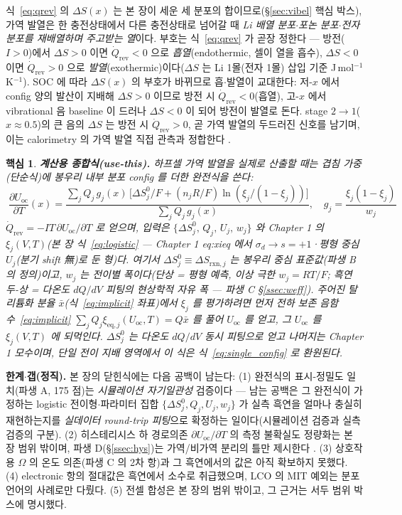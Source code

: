 \documentclass[11pt,a4paper]{article}
\newtheorem*{keybox}{핵심}
\newcommand{\rxn}{\mathrm{rxn}}
\newcommand{\eq}{\mathrm{eq}}
\newcommand{\rev}{\mathrm{rev}}
\newcommand{\oc}{\mathrm{oc}}
\begin{document}
식~\eqref{eq:qrev} 의 $\Delta S(x)$ 는 본 장이 세운 세 분포의 합이므로(\S\ref{sec:vibel} 핵심 박스), 가역
발열은 한 충전상태에서 다른 충전상태로 넘어갈 때 \emph{Li 배열 분포$\cdot$포논 분포$\cdot$전자 분포를 재배열하며
주고받는 열}이다. 부호는 식~\eqref{eq:qrev} 가 곧장 정한다 — 방전($I>0$)에서 $\Delta S>0$ 이면 $\dot Q_\rev<0$ 으로
\emph{흡열}(endothermic, 셀이 열을 흡수), $\Delta S<0$ 이면 $\dot Q_\rev>0$ 으로 \emph{발열}(exothermic)이다($\Delta S$
는 Li 1몰(전자 1몰) 삽입 기준 J\,mol$^{-1}$K$^{-1}$). SOC 에 따라 $\Delta S(x)$ 의 부호가 바뀌므로 흡$\cdot$발열이 교대한다: 저-$x$ 에서
config 양의 발산이 지배해 $\Delta S>0$ 이므로 방전 시 $\dot Q_\rev<0$(흡열), 고-$x$ 에서 vibrational 음
baseline 이 드러나 $\Delta S<0$ 이 되어 방전이 발열로 돈다. stage $2\to1$($x\approx0.5$)의 큰 음의 $\Delta S$
는 방전 시 $\dot Q_\rev>0$, 곧 가역 발열의 두드러진 신호를 남기며, 이는 calorimetry 의 가역 발열 직접 관측과
정합한다 \cite{standardised2024}.

\begin{keybox}
\textbf{계산용 종합식(use-this).} 하프셀 가역 발열을 실제로 산출할 때는 겹침 가중(단순식)에 봉우리 내부 분포
config 를 더한 \emph{완전식}을 쓴다:
\[
\boxed{\;\frac{\partial U_\oc}{\partial T}(x)
=\frac{\sum_j Q_j\,g_j(x)\,\bigl[\Delta S^0_j/F+(n_jR/F)\ln(\xi_j/(1-\xi_j))\bigr]}{\sum_j Q_j\,g_j(x)},\quad
g_j=\frac{\xi_j(1-\xi_j)}{w_j}\;}
\]
$\dot Q_\rev=-IT\,\partial U_\oc/\partial T$ 로 얻으며, \emph{입력}은 $\{\Delta S^0_j,\,Q_j,\,U_j,\,w_j\}$ 와 Chapter 1 의
$\xi_j(V,T)$(본 장 식~\eqref{eq:logistic} — Chapter 1 eq:xieq 에서 $\sigma_d\to s{=}+1$·평형 중심 $U_j$(분기 shift 無)로 둔 형)다. 여기서 $\Delta S^0_j\equiv\Delta S_{\rxn,j}$ 는 봉우리 중심 표준값(파생 B 의
정의)이고, $w_j$ 는 전이별 폭이다(단상 = 평형 예측, 이상 극한 $w_j{=}RT/F$; 흑연 두-상 = 다온도 $dQ/dV$
피팅의 현상학적 자유 폭 — 파생 C \S\ref{ssec:weff}). 주어진 탈리튬화 분율 $\bar x$(식~\eqref{eq:implicit} 좌표)에서 $\xi_j$ 를 평가하려면 먼저 전하 보존
음함수~\eqref{eq:implicit} $\sum_j Q_j\xi_{\eq,j}(U_\oc,T)=Q\bar x$ 를 풀어 $U_\oc$ 를 얻고, 그 $U_\oc$ 를
$\xi_j(V,T)$ 에 되먹인다. $\Delta S^0_j$ 는 다온도 $dQ/dV$ 동시 피팅으로 얻고 나머지는 Chapter 1 모수이며, 단일 전이 지배 영역에서 이 식은
식~\eqref{eq:single_config} 로 환원된다.
\end{keybox}

\textbf{한계$\cdot$갭(정직).} 본 장의 닫힌식에는 다음 공백이 남는다: (1) 완전식의 표시-정밀도 일치(파생 A,
175 점)는 \emph{시뮬레이션 자기일관성} 검증이다 — 남는 공백은 그 완전식이 가정하는 logistic
전이형$\cdot$파라미터 집합 $\{\Delta S^0_j,Q_j,U_j,w_j\}$ 가 실측 흑연을 얼마나 충실히 재현하는지를
\emph{실데이터 round-trip 피팅}으로 확정하는 일이다(시뮬레이션 검증과 실측 검증의 구분). (2) 히스테리시스 하 경로의존 $\partial U_\oc/\partial T$ 의 측정 불확실도
정량화는 본 장 범위 밖이며, 파생 D(\S\ref{ssec:hys})는 가역/비가역 분리의 틀만 제시한다 \cite{hysteresis2018}. (3) 상호작용
$\Omega$ 의 온도 의존(파생 C 의 2차 항)과 그 흑연에서의 값은 아직 확보하지 못했다. (4) electronic 항의 절대값은
흑연에서 소수로 취급했으며, LCO 의 MIT 예외는 분포 언어의 사례로만 다뤘다. (5) 전셀 합성은 본 장의 범위
밖이고, 그 근거는 서두 범위 박스에 명시했다.
\end{document}
